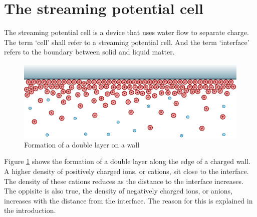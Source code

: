 
%
%
%



\section{The streaming potential cell}
\label{sect:streamingPotentialCell}

The streaming potential cell is a device that uses water flow to separate charge.
The term `cell' shall refer to a streaming potential cell.
And the term `interface' refers to the boundary between solid and liquid matter.

\begin{figure}
    \centering
    \includegraphics{content/pt1/01-PowerHarvesting/graphics/doubleLayerOnWall}
    \caption{\label{fig:doubleLayerOnWall}Formation of a double layer on a wall}
\end{figure}

Figure \ref{fig:doubleLayerOnWall} shows the formation of a double layer along the edge of a charged wall.
A higher density of positively charged ions, or cations, sit close to the interface.
The density of these cations reduces as the distance to the interface increases.
The oppisite is also true, the density of negatively charged ions, or anions, increases with the distance from the interface.
The reason for this is explained in the introduction.

